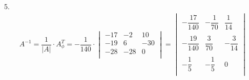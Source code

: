 \begin{enumerate}
\begin{gather*}
			\end{gather*}
			\\
			5. 
			\begin{gather*}
				A^{-1} = \dfrac{1}{|A|} \cdot A_{\phi}^{T} = -\dfrac{1}{140} \cdot 
				\begin{vmatrix}
					-17 & -2 & 10\\
					-19 & 6 & -30\\
					-28 & -28 & 0\\
				\end{vmatrix}
				=
				\begin{vmatrix}
					-\dfrac{17}{140} & -\dfrac{1}{70} & \dfrac{1}{14}\\
					\\
					-\dfrac{19}{140} & \dfrac{3}{70} & -\dfrac{3}{14}\\
					\\
					-\dfrac{1}{5} & -\dfrac{1}{5} & 0\\
				\end{vmatrix} 
			\end{gather*}
			

\end{enumerate}

